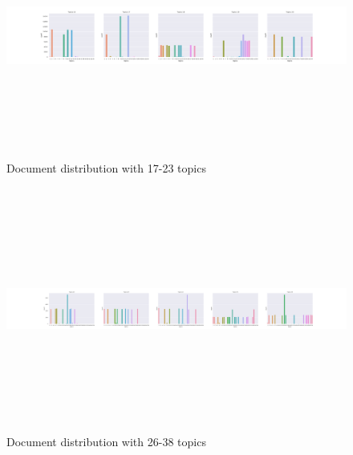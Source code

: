 \begin{figure}[h]
    \centering
    \includegraphics[width=15cm, height=8cm]{figures/doc_distr/doc_distribution_17-23.png}
    \caption{Document distribution with 17-23 topics}
    \label{fig:Doc_distr_17-21}
\end{figure}

\begin{figure}[h]
    \centering
    \includegraphics[width=15cm, height=8cm]{figures/doc_distr/doc_distribution_26-38.png}
    \caption{Document distribution with 26-38 topics}
    \label{fig:Doc_distr_26-38}
\end{figure}

\FloatBarrier

